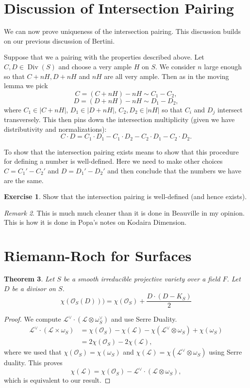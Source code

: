 \documentclass[12pt]{article}
\numberwithin{equation}{section}
\newtheorem{theorem}{Theorem}[subsection]
\theoremstyle{definition}
\newtheorem{exercise}[theorem]{Exercise}
\theoremstyle{remark}
\newtheorem{remark}[theorem]{Remark}
\newcommand{\Ocal}{\mathcal{O}}
\newcommand{\Div}{\operatorname{Div}}
\newcommand{\Lcal}{\mathcal{L}}
\begin{document}
\section{Discussion of Intersection Pairing}
We can now prove uniqueness of the intersection pairing. 
This discussion builds on our previous discussion of Bertini. 

Suppose that we a pairing with the properties described above. 
Let $C,D\in \Div(S)$ and choose a very ample $H$ on $S$.
We consider $n$ large enough so that $C+nH, D+nH$ and $nH$ are all very ample. 
Then as in the moving lemma we pick
 $$ C = (C+nH)-nH \sim  C_1 - C_2, $$
 $$ D = (D+nH)-nH \sim D_1-D_2, $$
where $C_1 \in \vert C+nH \vert$, $D_1 \in \vert D+nH\vert$, $C_2,D_2\in \vert nH \vert$ so that $C_i$ and $D_j$ intersect transversely. 
This then pins down the intersection multiplicity (given we have distributivity and normalizations):
 $$ C\cdot D = C_1\cdot D_1 - C_1 \cdot D_2 - C_2 \cdot D_1 - C_2\cdot D_2.$$

To show that the intersection pairing exists means to show that this procedure for defining a number is well-defined.
Here we need to make other choices $C=C_1'-C_2'$ and $D=D_1'-D_2'$ and then conclude that the numbers we have are the same. 

\begin{exercise}
	Show that the intersection pairing is well-defined (and hence exists).
\end{exercise}

\begin{remark}
	This is much much cleaner than it is done in Beauville in my opinion. 
	This is how it is done in Popa's notes on Kodaira Dimension.
\end{remark}


\section{Riemann-Roch for Surfaces}

\begin{theorem}
	Let $S$ be a smooth irreducible projective variety over a field $F$. 
	Let $D$ be a divisor on $S$. 
	\begin{equation}
	\chi(\Ocal_S(D))) = \chi(\Ocal_S) + \frac{D\cdot (D-K_S)}{2}
	\end{equation}
\end{theorem}
\begin{proof}
	We compute $\Lcal^{\vee} \cdot (\Lcal \otimes \omega_S^\vee)$ and use Serre Duality. 
	\begin{align*}
	\Lcal^{\vee}\cdot (\Lcal \times \omega_S) &= \chi(\Ocal_S) - \chi(\Lcal) -\chi(\Lcal^{\vee} \otimes\omega_S) + \chi(\omega_S) \\
	&= 2\chi(\Ocal_S) - 2\chi(\Lcal),
	\end{align*}
where we used that $\chi(\Ocal_S) = \chi(\omega_S)$ and $\chi(\Lcal) = \chi(\Lcal^{\vee}\otimes \omega_S)$ using Serre duality.
This proves 
 $$ \chi(\Lcal) = \chi(\Ocal_S) - \Lcal^{\vee}\cdot( \Lcal \otimes \omega_S), $$
which is equivalent to our result.
\end{proof}
\end{document}
